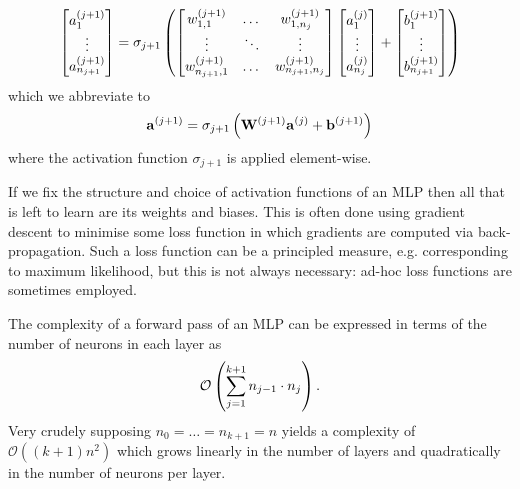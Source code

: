 \documentclass[11pt]{article}
\begin{document}
$$
\begin{bmatrix}
    a_1^{(j+1)}\\
    \vdots\\
    a_{n_{j+1}}^{(j+1)}
\end{bmatrix}
=
\sigma_{j+1}\left(
\begin{bmatrix}
    w_{1,1}^{(j+1)} & \dots & w_{1,n_j}^{(j+1)}\\
    \vdots & \ddots & \vdots\\
    w_{n_{j+1},1}^{(j+1)} & \dots & w_{n_{j+1},n_j}^{(j+1)}
\end{bmatrix}
\begin{bmatrix}
    a_1^{(j)}\\
    \vdots\\
    a_{n_j}^{(j)}
\end{bmatrix}
+
\begin{bmatrix}
    b_1^{(j+1)}\\
    \vdots\\
    b_{n_{j+1}}^{(j+1)}
\end{bmatrix}
\right)
$$
which we abbreviate to
$$
\mathbf{a}^{(j+1)}=\sigma_{j+1}\left(\mathbf{W}^{(j+1)}\mathbf{a}^{(j)}+\mathbf{b}^{(j+1)}\right)
$$
where the activation function $\sigma_{j+1}$ is applied element-wise.

If we fix the structure and choice of activation functions of an MLP then all that is left to learn are its weights and biases. This is often done using gradient descent to minimise some loss function in which gradients are computed via back-propagation. Such a loss function can be a principled measure, e.g. corresponding to maximum likelihood, but this is not always necessary: ad-hoc loss functions are sometimes employed.

\begin{tcolorbox}[title={\centering\textbf{Crudely advocating for depth over width}}, colback=myLightBlue, colbacktitle=myDarkBlue, colframe=myDarkBlue, coltitle=white]
    The complexity of a forward pass of an MLP can be expressed in terms of the number of neurons in each layer as
    $$
    \mathcal{O}
    \left(
    \sum_{j=1}^{k+1}n_{j-1}\cdot n_j
    \right).
    $$
    Very crudely supposing $n_0=\dots=n_{k+1}=n$ yields a complexity of
    $
    \mathcal{O}((k+1)n^2)
    $
    which grows linearly in the number of layers and quadratically in the number of neurons per layer.
\end{tcolorbox}

\end{document}
